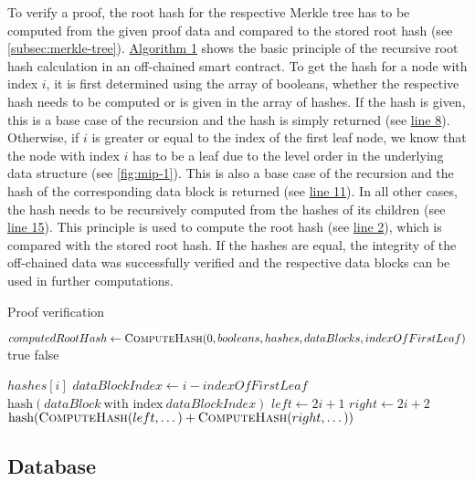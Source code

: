 			To verify a proof, the root hash for the respective Merkle tree has to be computed from the given proof data and compared to the stored root hash (see \autoref{subsec:merkle-tree}).
			\hyperref[alg:proof-verification]{Algorithm 1} shows the basic principle of the recursive root hash calculation in an off-chained smart contract.
			To get the hash for a node with index $i$, it is first determined using the array of booleans, whether the respective hash needs to be computed or is given in the array of hashes.
			If the hash is given, this is a base case of the recursion and the hash is simply returned (see \hyperref[algline:8]{line 8}).
			Otherwise, if $i$ is greater or equal to the index of the first leaf node, we know that the node with index $i$ has to be a leaf due to the level order in the underlying data structure (see \autoref{fig:mip-1}).
			This is also a base case of the recursion and the hash of the corresponding data block is returned (see \hyperref[algline:11]{line 11}).
			In all other cases, the hash needs to be recursively computed from the hashes of its children (see \hyperref[algline:15]{line 15}).
			This principle is used to compute the root hash (see \hyperref[algline:2]{line 2}), which is compared with the stored root hash.
			If the hashes are equal, the integrity of the off-chained data was successfully verified and the respective data blocks can be used in further computations.

			\begin{algorithm}
				\caption{Proof verification}
				\label{alg:proof-verification}

				\begin{algorithmic}[1]
						\State $computedRootHash \gets \Call{ComputeHash}{0, booleans, hashes, dataBlocks, indexOfFirstLeaf}$ \label{algline:2}
						 \Return true 
						\Else{} \Return false 
						\EndIf	
					\EndProcedure

					\State
						 
							\State \Return $hashes[i]$ \label{algline:8}
						 
							\State $dataBlockIndex \gets i - indexOfFirstLeaf$ 
							\State \Return $\textrm{hash}(dataBlock\ \textrm{with index}\ dataBlockIndex)$ \label{algline:11}
						\Else{} 
							\State $left \gets 2i + 1$ 
							\State $right \gets 2i + 2$ 
							\State \Return $\textrm{hash}(\Call{ComputeHash}{left, \dots} + \Call{ComputeHash}{right, \dots})$ \label{algline:15}
						\EndIf
					\EndProcedure
				\end{algorithmic}
			\end{algorithm}

	\subsection{Database}
	\label{subsec:approach-implementation-database}
